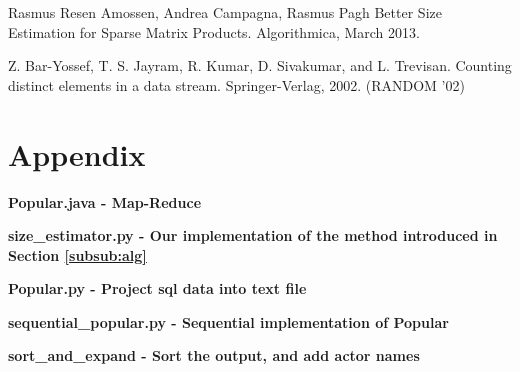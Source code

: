 \documentclass[a4paper,11pt]{article}
\begin{document}
\newpage

\begin{thebibliography}{}

Rasmus Resen Amossen, Andrea Campagna, Rasmus Pagh
Better Size Estimation for Sparse Matrix Products. Algorithmica, March 2013.

Z. Bar-Yossef, T. S. Jayram, R. Kumar, D. Sivakumar, and L. Trevisan.
Counting distinct elements in a data stream. Springer-Verlag, 2002. (RANDOM '02)

\end{thebibliography}

\section*{Appendix}
\textbf{Popular.java - Map-Reduce}

\textbf{size\_estimator.py - Our implementation of the method introduced in Section \ref{subsub:alg}}

\textbf{Popular.py - Project sql data into text file}

\textbf{sequential\_popular.py - Sequential implementation of Popular}

\textbf{sort\_and\_expand - Sort the output, and add actor names}

\end{document}
